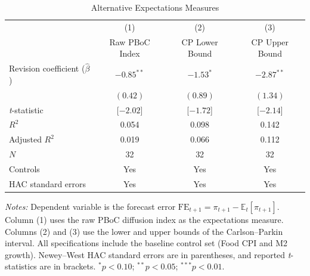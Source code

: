 \begin{table}[!htbp]
\centering
\begin{threeparttable}
\caption{Alternative Expectations Measures}
\label{tab:alt_measures}
\begin{tabular}{lccc}
\toprule
 & (1) & (2) & (3) \\
 & Raw PBoC Index & CP Lower Bound & CP Upper Bound \\
\midrule
Revision coefficient ($\hat{\beta}$) & $-0.85^{**}$ & $-1.53^{*}$ & $-2.87^{**}$ \\
 & $(0.42)$ & $(0.89)$ & $(1.34)$ \\
\addlinespace
\textit{t}-statistic & [$-2.02$] & [$-1.72$] & [$-2.14$] \\
\addlinespace
$R^2$ & 0.054 & 0.098 & 0.142 \\
Adjusted $R^2$ & 0.019 & 0.066 & 0.112 \\
$N$ & 32 & 32 & 32 \\
\midrule
Controls & Yes & Yes & Yes \\
HAC standard errors & Yes & Yes & Yes \\
\bottomrule
\end{tabular}
\begin{tablenotes}[flushleft]
\footnotesize
\item \textit{Notes:} Dependent variable is the forecast error $\text{FE}_{t+1}=\pi_{t+1}-\mathbb{E}_t[\pi_{t+1}]$. Column (1) uses the raw PBoC diffusion index as the expectations measure. Columns (2) and (3) use the lower and upper bounds of the Carlson--Parkin interval. All specifications include the baseline control set (Food CPI and M2 growth). Newey--West HAC standard errors are in parentheses, and reported \textit{t}-statistics are in brackets. $^{*}p<0.10$; $^{**}p<0.05$; $^{***}p<0.01$.
\end{tablenotes}
\end{threeparttable}
\end{table}
